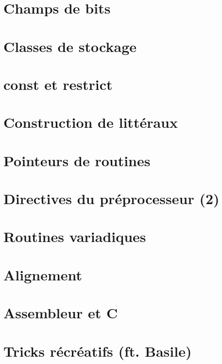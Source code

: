 \documentclass{minitelreport}
\begin{document}
\begin{refsection}
		\section{Champs de bits}
			\label{sec:champs_de_bits}
			
		\section{Classes de stockage}
			\label{sec:classes_de_stockage}
			
		\section{const et restrict}
			\label{sec:const_et_restrict}
			
		\section{Construction de littéraux}
			\label{sec:construction_de_litt_raux}
			
		\section{Pointeurs de routines}
			\label{sec:pointeurs_de_routines}
			
		\section{Directives du préprocesseur (2)}
			\label{sec:directives_de_pr_processeurs_2_}
			
		\section{Routines variadiques}
			\label{sec:routines_variadiques}
			
		\section{Alignement}
			\label{sec:alignement}
			
		\section{Assembleur et C}
			\label{sec:assembleur_et_c}
			
		\section{Tricks récréatifs (ft. Basile)}
			\label{sec:tricks_r_cr_atifs_ft_basile_}
			

\end{refsection}
\end{document}
